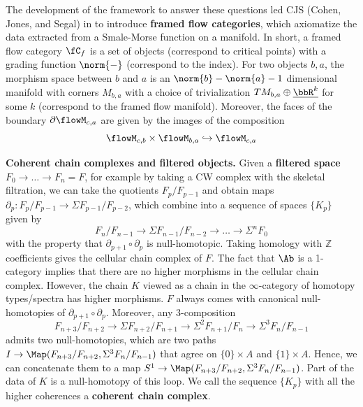 The development of the framework to answer these questions led CJS (Cohen, Jones, and Segal) in \cite{CJS95} to introduce \textbf{framed flow categories}, which axiomatize the data extracted from a Smale-Morse function on a manifold. In short, a framed flow category $\fC_f$ is a set of objects (correspond to critical points) with a grading function $\norm{-}$ (correspond to the index). For two objects $b,a$, the morphism space between $b$ and $a$ is an $\norm{b}-\norm{a}-1$ dimensional manifold with corners $M_{b,a}$ with a choice of trivialization $TM_{b,a} \oplus \underline{\bbR^k}$ for some $k$ (correspond to the framed flow manifold).
Moreover, the faces of the boundary $\partial \flowM_{c,a}$ are given by the images of the composition
\begin{equation*}
    \flowM_{c,b} \times \flowM_{b,a} \hookrightarrow \flowM_{c,a}
\end{equation*}

\textbf{Coherent chain complexes and filtered objects.} Given a \textbf{filtered space} $F_0 \to \dots \to F_n = F$, for example by taking a CW complex with the skeletal filtration, we can take the quotients $F_p/F_{p-1}$ and obtain maps $\partial_{p}:F_{p}/F_{p-1} \to \Sigma F_{p-1}/F_{p-2}$, which combine into a sequence of spaces $\{K_p\}$ given by
\begin{equation*}
    F_n/F_{n-1} \to \Sigma F_{n-1}/F_{n-2} \to \dots \to \Sigma^{n} F_0
\end{equation*}
with the property that $\partial_{p+1} \circ \partial_p$ is null-homotopic. Taking homology with $\mathbb{Z}$ coefficients gives the cellular chain complex of $F$. The fact that $\Ab$ is a 1-category implies that there are no higher morphisms in the cellular chain complex. However, the chain $K$ viewed as a chain in the $\infty$-category of homotopy types/spectra has higher morphisms. $F$ always comes with canonical null-homotopies of $\partial_{p+1} \circ \partial_p$. Moreover, any 3-composition
\begin{equation*}
    F_{n+3}/F_{n+2} \to \Sigma F_{n+2}/F_{n+1} \to \Sigma^2 F_{n+1}/F_{n} \to \Sigma^3 F_{n}/F_{n-1}
\end{equation*}
admits two null-homotopies, which are two paths $I \to \Map(F_{n+3}/F_{n+2}, \Sigma^3 F_{n}/F_{n-1})$ that agree on $\{0\}\times A$ and $ \{1\}\times A$. Hence, we can concatenate them to a map $S^1 \to \Map(F_{n+3}/F_{n+2}, \Sigma^3 F_{n}/F_{n-1})$. Part of the data of $K$ is a null-homotopy of this loop. We call the sequence $\{K_p\}$ with all the higher coherences a \textbf{coherent chain complex}.


